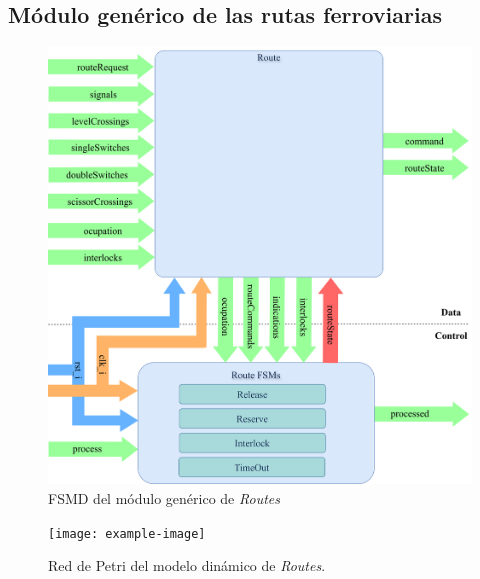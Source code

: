 \subsection{Módulo genérico de las rutas ferroviarias}

\lipsum[1]

\begin{figure}[H]
	\centering
	\includegraphics[width=1\textwidth]{Figuras/RTS_module}
	\centering\caption{FSMD del módulo genérico de \textit{Routes}}
	\label{fig:RTS_module}
\end{figure}

\lipsum[1]

\begin{figure}[H]
	\centering
	\texttt{[image: example-image]}
	\centering\caption{Red de Petri del modelo dinámico de \textit{Routes}.}
	\label{fig:RTS_Petri}
\end{figure}

\lipsum[1]